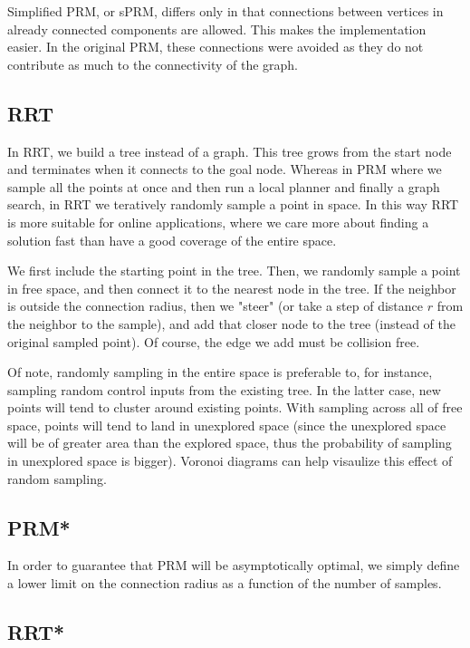 \documentclass[a4paper]{article}
\begin{document}
Simplified PRM, or sPRM, differs only in that connections between vertices in
already connected components are allowed. This makes the implementation easier.
In the original PRM, these connections were avoided as they do not contribute as
much to the connectivity of the graph.

\subsection{RRT}

In RRT, we build a tree instead of a graph. This tree grows from the start node
and terminates when it connects to the goal node. Whereas in PRM where we sample
all the points at once and then run a local planner and finally a graph search,
in RRT we teratively randomly sample a point in space. In this way RRT is more
suitable for online applications, where we care more about finding a solution
fast than have a good coverage of the entire space.

We first include the starting point in the tree. Then, we randomly sample a
point in free space, and then connect it to the nearest node in the tree. If the
neighbor is outside the connection radius, then we "steer" (or take a step of
distance $r$ from the neighbor to the sample), and add that closer node to the tree
(instead of the original sampled point). Of course, the edge we add must be
collision free. 

Of note, randomly sampling in the entire space is preferable to, for instance,
sampling random control inputs from the existing tree. In the latter case, new
points will tend to cluster around existing points. With sampling across all of
free space, points will tend to land in unexplored space (since the unexplored
space will be of greater area than the explored space, thus the probability of
sampling in unexplored space is bigger). Voronoi diagrams can help visaulize
this effect of random sampling. 


\subsection{PRM*}

In order to guarantee that PRM will be asymptotically optimal, we simply define
a lower limit on the connection radius as a function of the number of samples.

\subsection{RRT*}
\end{document}
